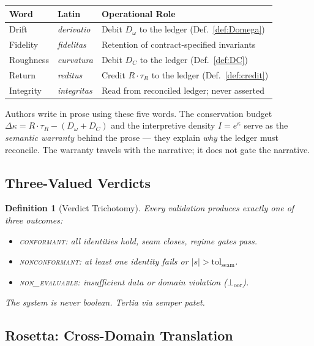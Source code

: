 \documentclass[
  aps,
  prd,
  preprint,
  superscriptaddress,
  nofootinbib,
  floatfix,
  longbibliography
]{revtex4-2}
\newtheorem{definition}[theorem]{Definition}
\newcommand{\tR}{\tau_{\!R}}
\newcommand{\tolseam}{\mathrm{tol}_{\mathrm{seam}}}
\newcommand{\regime}[1]{\textrm{\upshape\scshape#1}}
\newcommand{\conform}{\regime{conformant}}
\newcommand{\nonconform}{\regime{nonconformant}}
\newcommand{\Drft}{\omega}
\newcommand{\Curv}{C}
\newcommand{\Logint}{\kappa}
\newcommand{\lat}[1]{\textit{#1}}
\begin{document}
\begin{center}
\begin{tabular}{@{}lll@{}}
\toprule
\textbf{Word} & \textbf{Latin} & \textbf{Operational Role} \\
\midrule
Drift      & \lat{derivatio} &
  Debit $D_\Drft$ to the ledger (Def.~\ref{def:Domega}) \\
Fidelity   & \lat{fidelitas} &
  Retention of contract-specified invariants \\
Roughness  & \lat{curvatura} &
  Debit $D_\Curv$ to the ledger (Def.~\ref{def:DC}) \\
Return     & \lat{reditus} &
  Credit $R \cdot \tR$ to the ledger (Def.~\ref{def:credit}) \\
Integrity  & \lat{integritas} &
  Read from reconciled ledger; never asserted \\
\bottomrule
\end{tabular}
\end{center}

Authors write in prose using these five words.
The conservation budget
$\Delta\Logint = R \cdot \tR - (D_\Drft + D_\Curv)$
and the interpretive density $I = e^\Logint$ serve as
the \emph{semantic warranty} behind the prose — they
explain \emph{why} the ledger must reconcile.
The warranty travels with the narrative; it does not
gate the narrative.

\subsection{Three-Valued Verdicts}

\begin{definition}[Verdict Trichotomy]\label{def:verdict}
Every validation produces exactly one of three outcomes:
\begin{itemize}[nosep,leftmargin=*]
  \item \conform{}: all identities hold, seam closes,
    regime gates pass.
  \item \nonconform{}: at least one identity fails or
    $|s| > \tolseam$.
  \item \regime{non\_evaluable}: insufficient data or
    domain violation ($\bot_{\mathrm{oor}}$).
\end{itemize}
The system is never boolean.
\lat{Tertia via semper patet.}
\end{definition}

\subsection{Rosetta: Cross-Domain Translation}
\end{document}

